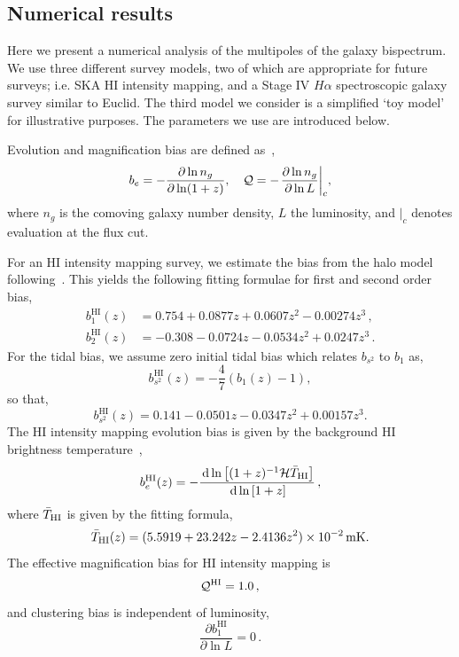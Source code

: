 {\subsection*{Numerical results}

Here we present a numerical analysis of the multipoles of the galaxy bispectrum. We use three different survey models, two of which are appropriate for future surveys; i.e. SKA HI intensity mapping, and a Stage IV \(H\alpha\) spectroscopic galaxy survey similar to Euclid. The third model we consider is a simplified `toy model' for illustrative purposes. The parameters we use are introduced below. 

Evolution and magnification bias are defined as~\cite{Alonso:2015uua}, 
\begin{equation}\label{eq:beQdefs}
	b_e = - \frac{\partial \ln n_g}{\partial \ln(1+z)}, \quad \Q = - \evaluat*{\frac{\partial\ln n_g}{\partial \ln L}}_{c},
\end{equation}
where \(n_g\) is the comoving galaxy number density, \(L\) the luminosity, and \(|_c\) denotes evaluation at the flux cut. 

For an HI intensity mapping survey, we estimate the bias from the halo model following~\cite{Umeh:2015gza}.  
This yields the following fitting formulae for first and second order bias, 
\begin{align}
	b^{\mathrm{HI}}_1(z) &=    0.754 + 0.0877 z + 0.0607 z^2 - 0.00274 z^3 \,, \\ 
	b^{\mathrm{HI}}_2(z) &=  -0.308 - 0.0724 z - 0.0534 z^2 + 0.0247 z^3  \,.
\end{align}
For the tidal bias, we assume zero initial tidal bias which relates \(b_{s^2}\) to \(b_1\) as,
\begin{equation}
	b_{s^2}^{\mathrm{HI}}(z) = - \frac{4}{7} (b_1(z) -1),
\end{equation}
so that, 
\begin{equation}
	b_{s^2}^{\mathrm{HI}}(z) = 0.141 - 0.0501 z - 0.0347 z^2 + 0.00157 z^3.
\end{equation}
The HI intensity mapping evolution bias is given by the background HI brightness temperature~\cite{Fonseca:2018hsu},
\begin{equation}
	b_e^{\mathrm{HI}}(z) = - \frac{\,\mathrm{d} \ln \left[ (1+z)^{-1} \mathcal{H} \bar{T}_{\mathrm{HI}}\right]}{\,\mathrm{d} \ln\left[1+z \right]}\,,
\end{equation}
where \(\bar{T}_{\mathrm{HI}}\) is given by the fitting formula, 
\begin{equation}
	\bar{T}_{\mathrm{HI}}(z) = (5.5919 + 23.242  z - 2.4136  z^2)\times 10^{-2} \, \mathrm{mK}.
\end{equation}
The effective magnification bias for HI intensity mapping is~\cite{Fonseca:2018hsu}
\begin{equation}
	\mathcal{Q}^{\mathrm{HI}} = 1.0\,,
\end{equation}
and clustering bias is independent of luminosity, 
\begin{equation}
	\frac{\partial b_1^\mathrm{HI}}{\partial \ln L} = 0\,.
\end{equation}

}
